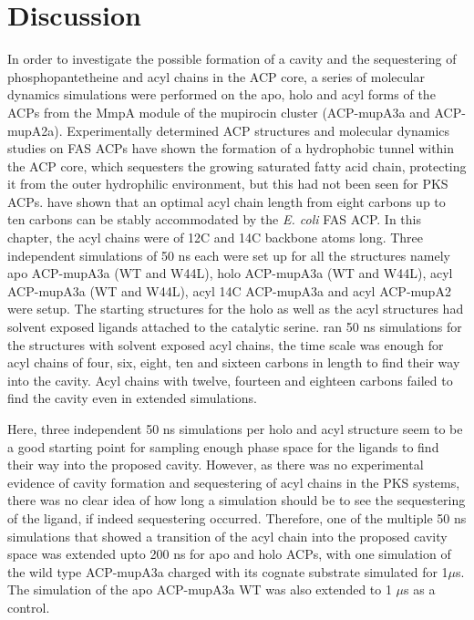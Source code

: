 \section{Discussion}
\label{sec:chap5discussion}
In order to investigate the possible formation of a cavity and the sequestering of phosphopantetheine and acyl chains in the ACP core, a series of molecular dynamics simulations were performed on the apo, holo and acyl forms of the ACPs from the MmpA module of the mupirocin cluster (ACP-mupA3a and ACP-mupA2a). Experimentally determined ACP structures and molecular dynamics studies on FAS ACPs have shown the formation of a hydrophobic tunnel within the ACP core, which sequesters the growing saturated fatty acid chain, protecting it from the outer hydrophilic environment, but this had not been seen for PKS ACPs. \textcite{Chan2008} have shown that an optimal acyl chain length from eight carbons up to ten carbons can be stably accommodated by the \textit{E. coli} FAS ACP. In this chapter, the acyl chains were of 12C and 14C backbone atoms long. Three independent simulations of 50 ns each were set up for all the structures namely apo ACP-mupA3a (WT and W44L), holo ACP-mupA3a (WT and W44L), acyl ACP-mupA3a (WT and W44L), acyl 14C ACP-mupA3a and acyl ACP-mupA2 were setup. The starting structures for the holo as well as the acyl structures had solvent exposed ligands attached to the catalytic serine. \textcite{Chan2008} ran 50 ns simulations for the structures with solvent exposed acyl chains, the time scale was enough for acyl chains of four, six, eight, ten and sixteen carbons in length to find their way into the cavity. Acyl chains with twelve, fourteen and eighteen carbons failed to find the cavity even in extended simulations. 

Here, three independent 50 ns simulations per holo and acyl structure seem to be a good starting point for sampling enough phase space for the ligands to find their way into the proposed cavity. However, as there was no experimental evidence of cavity formation and sequestering of acyl chains in the PKS systems, there was no clear idea of how long a simulation should be to see the sequestering of the ligand, if indeed sequestering occurred. Therefore, one of the multiple 50 ns simulations that showed a transition of the acyl chain into the proposed cavity space was extended upto 200 ns for apo and holo ACPs, with one simulation of the wild type ACP-mupA3a charged with its cognate substrate simulated for 1$ \mu $s. The simulation of the apo ACP-mupA3a WT was also extended to 1 $ \mu $s as a control.

